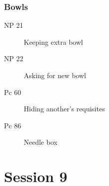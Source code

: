 \documentclass[11pt,oneside]{memoir}
\begin{document}
\begin{multicols}{2}
\subsection{Bowls}

\begin{description}
\item[NP 21] Keeping extra bowl
\item[NP 22] Asking for new bowl
\item[Pc 60] Hiding another's requisites
\item[Pc 86] Needle box
\end{description}

\end{multicols}

\chapter{Session 9}
\end{document}
